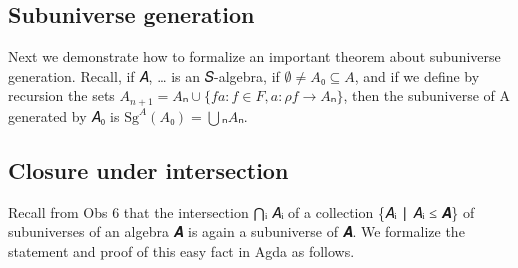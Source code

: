 \documentclass[a4paper,USenglish,cleveref,autoref,thm-restate]{lipics-v2019}
\begin{document}
\subsection{Subuniverse generation}\label{sec:subuniverse-generation}
Next we demonstrate how to formalize an important theorem about subuniverse generation. Recall, if \AS\ASy{=}\AS\ASy{(}\AB 𝐴, …\AgdaSymbol{)} is an 𝑆-algebra, if \(∅ ≠ 𝐴₀ ⊆ 𝐴\), and if we define by recursion the sets \(A_{n+1} = Aₙ ∪ \{ f a : f ∈ F, a : ρ f → Aₙ \}\), then the subuniverse of A generated by 𝐴₀ is \(\mathrm{Sg}^A(A₀) = ⋃ₙ Aₙ\).
\begin{code}\end{code}

\subsection{Closure under intersection}\label{sec:closure-under-intersection}
Recall from Obs 6 that the intersection ⋂ᵢ 𝐴ᵢ of a collection \{𝐴ᵢ ∣ 𝐴ᵢ ≤ 𝑨\} of subuniverses of an algebra 𝑨 is
again a subuniverse of 𝑨. We formalize the statement and proof of this easy fact in Agda as follows.
\begin{code}\end{code}
\end{document}
